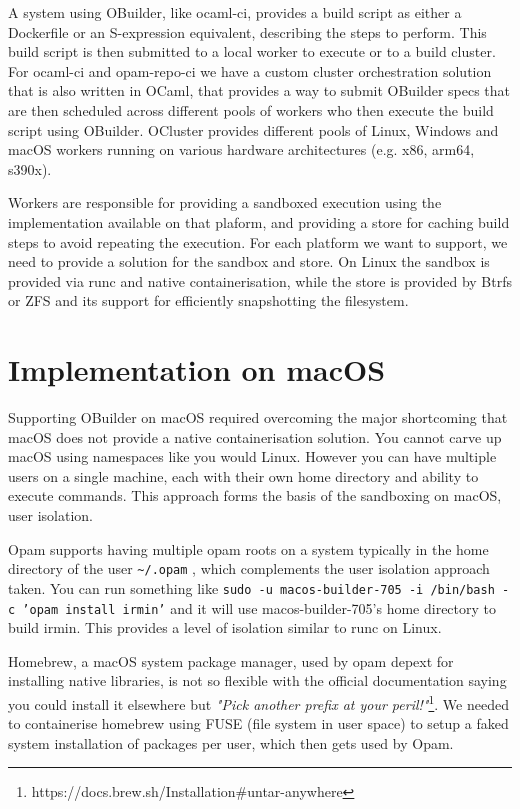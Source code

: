 \documentclass[manuscript,screen,review,sigplan]{acmart}
\begin{document}
A system using OBuilder, like ocaml-ci, provides a build script as either a Dockerfile or an S-expression equivalent, describing the steps to perform. This build script is then submitted to a local worker to execute or to a build cluster. For ocaml-ci and opam-repo-ci we have a custom cluster orchestration solution that is also written in OCaml, that provides a way to submit OBuilder specs that are then scheduled across different pools of workers who then execute the build script using OBuilder. OCluster provides different pools of Linux, Windows and macOS workers running on various hardware architectures (e.g. x86, arm64, s390x).

Workers are responsible for providing a sandboxed execution using the implementation available on that plaform, and providing a store for caching build steps to avoid repeating the execution. For each platform we want to support, we need to provide a solution for the sandbox and store. On Linux the sandbox is provided via runc and native containerisation, while the store is provided by Btrfs or ZFS and its support for efficiently snapshotting the filesystem.

\section{Implementation on macOS}

Supporting OBuilder on macOS required overcoming the major shortcoming that macOS does not provide a native containerisation solution. You cannot carve up macOS using namespaces like you would Linux. However you can have multiple users on a single machine, each with their own home directory and ability to execute commands. This approach forms the basis of the sandboxing on macOS, user isolation.

Opam supports having multiple opam roots on a system typically in the home directory of the user \texttt{\textasciitilde/.opam} , which complements the user isolation approach taken. You can run something like \texttt{sudo -u macos-builder-705 -i /bin/bash -c 'opam install irmin'} and it will use macos-builder-705’s home directory to build irmin. This provides a level of isolation similar to runc on Linux.

Homebrew, a macOS system package manager, used by opam depext for installing native libraries, 
is not so flexible with the official documentation saying you could install it elsewhere but 
 \emph{"Pick another prefix at your peril!"}\footnote{https://docs.brew.sh/Installation\#untar-anywhere}. We needed to containerise homebrew using FUSE (file system in user space) to setup a faked system installation of packages per user, which then gets used by Opam.
\end{document}
